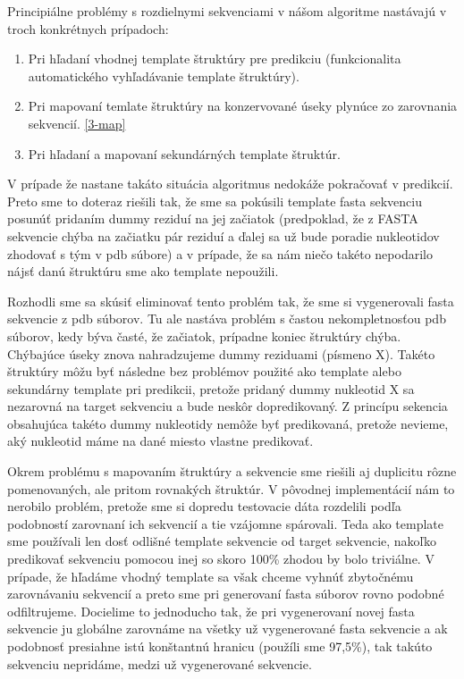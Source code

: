 \indent Principiálne problémy s rozdielnymi sekvenciami v nášom algoritme nastávajú v troch konkrétnych prípadoch: 

\begin{enumerate}
\item Pri hľadaní vhodnej template štruktúry pre predikciu (funkcionalita automatického vyhľadávanie template štruktúry).
\item Pri mapovaní temlate štruktúry na konzervované úseky plynúce zo zarovnania sekvencií. \ref{3-map}
\item Pri hľadaní a mapovaní sekundárných template štruktúr. 
\end{enumerate}


\indent V prípade že nastane takáto situácia algoritmus nedokáže pokračovať v predikcií. Preto sme to doteraz riešili tak, že sme sa pokúsili template fasta sekvenciu posunúť pridaním dummy reziduí na jej začiatok (predpoklad, že z FASTA sekvencie chýba na začiatku pár reziduí a ďalej sa už bude poradie nukleotidov zhodovať s tým v pdb súbore) a v prípade, že sa nám niečo takéto nepodarilo nájsť danú štruktúru sme ako template nepoužili.


\indent Rozhodli sme sa skúsiť eliminovať tento problém tak, že sme si vygenerovali fasta sekvencie z pdb súborov. Tu ale nastáva problém s častou nekompletnosťou pdb súborov, kedy býva časté, že začiatok, prípadne koniec štruktúry chýba. Chýbajúce úseky znova nahradzujeme dummy reziduami (písmeno X). Takéto štruktúry môžu byť následne bez problémov použité ako template alebo sekundárny template pri predikcii, pretože pridaný dummy nukleotid X sa nezarovná na target sekvenciu a bude neskôr dopredikovaný. Z princípu sekencia obsahujúca takéto dummy nukleotidy nemôže byť predikovaná, pretože nevieme, aký nukleotid máme na dané miesto vlastne predikovať.


\indent Okrem problému s mapovaním štruktúry a sekvencie sme riešili aj duplicitu rôzne pomenovaných, ale pritom rovnakých štruktúr. V pôvodnej implementácií nám to nerobilo problém, pretože sme si dopredu testovacie dáta rozdelili podľa podobností zarovnaní ich sekvencií a tie vzájomne spárovali. Teda ako template sme používali len dosť odlišné template sekvencie od target sekvencie, nakoľko predikovať sekvenciu pomocou inej so skoro 100\% zhodou by bolo triviálne. V prípade, že hľadáme vhodný template sa však chceme vyhnúť zbytočnému zarovnávaniu sekvencií a preto sme pri generovaní fasta súborov rovno podobné odfiltrujeme. Docielime to jednoducho tak, že pri vygenerovaní novej fasta sekvencie ju globálne zarovnáme na všetky už vygenerované fasta sekvencie a ak podobnosť presiahne istú konštantnú hranicu (použíli sme 97,5\%), tak takúto sekvenciu nepridáme, medzi už vygenerované sekvencie.